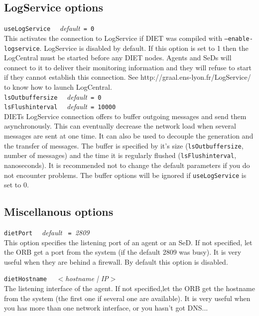 \subsection{LogService options}

\noindent
\texttt{useLogService} \ \ \emph{default}\texttt{ = 0}\\
This activates the connection to LogService if DIET was compiled with
\texttt{--enable-logservice}. LogService is disabled by default.
If this option is set to 1 then the LogCentral must be started
before any DIET nodes. Agents and SeDs will connect to it to
deliver their monitoring information and they will refuse to
start if they cannot establish this connection. See http://graal.ens-lyon.fr/LogService/
to know how to launch LogCentral.
\\

\noindent
\texttt{lsOutbuffersize} \ \ \emph{default}\texttt{ = 0}\\
\noindent
\texttt{lsFlushinterval} \ \ \emph{default}\texttt{ = 10000}\\
DIETs LogService connection offers to buffer outgoing messages
and send them asynchronously. This can eventually decrease the network
load when several messages are sent at one time. It can also be used
to decouple the generation and the transfer of messages.
The buffer is specified by it's size (\texttt{lsOutbuffersize},
number of messages) and the time it is regularly flushed
(\texttt{lsFlushinterval}, nanoseconds). It is recommended not
to change the default parameters if you do not encounter
problems. The buffer options will be ignored if \texttt{useLogService}
is set to 0.

\subsection{Miscellanous options}

\noindent
\texttt{dietPort} \ \ \emph{default} \texttt{ = }\emph{2809}\\
This option specifies the listening port of an agent or an SeD. If not specified, let the ORB get a port from the system (if the default 2809 was busy). It is very useful when they are behind a firewall. By default this option is disabled.

\noindent
\texttt{dietHostname} \ \ \emph{$<$hostname |  IP$>$}\\
The listening interface of the agent. If not specified,let the ORB get the hostname from the system (the first one if several one are available).
It is very useful when you has more than one network interface, or you hasn't got DNS...

